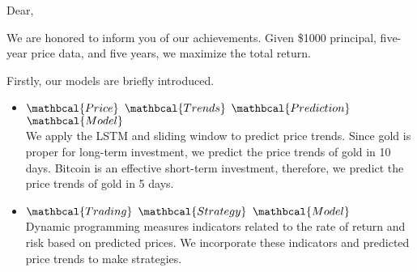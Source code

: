 \documentclass[12pt]{article}
\begin{document}
\noindent
Dear,

We are honored to inform you of our achievements. Given \$1000 principal, five-year price data, and five years, we maximize the total return. 

Firstly, our models are briefly introduced.
\begin{itemize}
\item $\mathbcal{Price}$  $\mathbcal{Trends}$  $\mathbcal{Prediction}$  $\mathbcal{Model}$\\
We apply the LSTM and sliding window to predict price trends. Since gold is proper for long-term investment, we predict the price trends of gold in 10 days. Bitcoin is an effective short-term investment, therefore, we predict the price trends of gold in 5 days.
\item $\mathbcal{Trading}$ $\mathbcal{Strategy}$ $\mathbcal{Model}$\\
Dynamic programming measures indicators related to the rate of return and risk based on predicted prices. We incorporate these indicators and predicted price trends to make strategies.
\end{itemize}
\end{document}
